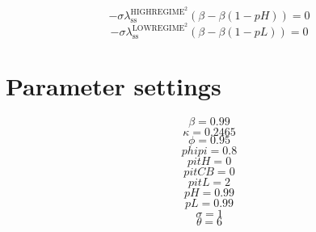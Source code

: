 \begin{equation}
-{\sigma} {\lambda^{\mathrm{HIGHREGIME}^{\mathrm{2}}}_\mathrm{ss}} \left(\beta - {\beta} \left(1 - {p\!H}\right)\right) = 0
\end{equation}
\begin{equation}
-{\sigma} {\lambda^{\mathrm{LOWREGIME}^{\mathrm{2}}}_\mathrm{ss}} \left(\beta - {\beta} \left(1 - {p\!L}\right)\right) = 0
\end{equation}






\section{Parameter settings}

\begin{equation}
\beta = 0.99
\end{equation}
\begin{equation}
\kappa = 0.2465
\end{equation}
\begin{equation}
\phi = 0.95
\end{equation}
\begin{equation}
{p\!h\!i\!p\!i} = 0.8
\end{equation}
\begin{equation}
{p\!i\!t\!H} = 0
\end{equation}
\begin{equation}
{p\!i\!t\!C\!B} = 0
\end{equation}
\begin{equation}
{p\!i\!t\!L} = 2
\end{equation}
\begin{equation}
{p\!H} = 0.99
\end{equation}
\begin{equation}
{p\!L} = 0.99
\end{equation}
\begin{equation}
\sigma = 1
\end{equation}
\begin{equation}
\theta = 6
\end{equation}


